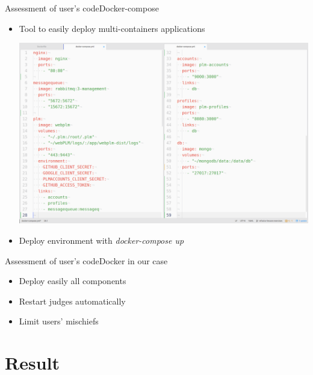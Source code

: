 \documentclass{beamer}
\begin{document}
\begin{frame}{Assessment of user's code}{Docker-compose}
  \begin{itemize}
  \item {
    Tool to easily deploy multi-containers applications
  }
  \begin{center}
    \includegraphics[scale=0.14]{img/docker-compose-white.png}
  \end{center}
  \item {
    Deploy environment with \emph{docker-compose up}
  }
  \end{itemize}
\end{frame}

\begin{frame}{Assessment of user's code}{Docker in our case}
  \begin{itemize}
  \item{
    Deploy easily all components
  }
  \item {
    Restart judges automatically
  }
  \item {
    Limit users' mischiefs
  }
  \end{itemize}
\end{frame}

\section{Result}
\end{document}
